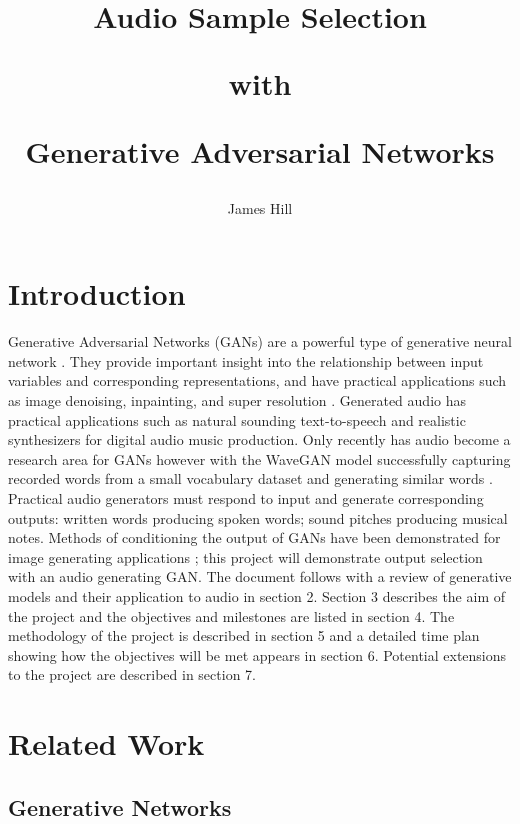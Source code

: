 \documentclass[a4paper, dvipsnames, titlepage]{article}
\title{
  \begin{center}Audio Sample Selection\end{center}
  \begin{center}with\end{center}
  \begin{center}Generative Adversarial Networks\end{center}
  }
\author{James Hill}
\date{}
\begin{document}
\maketitle
\tableofcontents

\newpage

\section{Introduction}

Generative Adversarial Networks (GANs) are a powerful type of generative neural network \citep{2014arXiv1406.2661G}.
They provide important insight into the relationship between input variables and corresponding representations, and have practical applications such as image denoising, inpainting, and super resolution \citep{openai_blog_2017}.
\newline
\newline
Generated audio has practical applications such as natural sounding text-to-speech and realistic synthesizers for digital audio music production.
Only recently has audio become a research area for GANs however with the WaveGAN model successfully capturing recorded words from a small vocabulary dataset and generating similar words \citep{2018arXiv180204208D}.
\newline
\newline
Practical audio generators must respond to input and generate corresponding outputs: written words producing spoken words; sound pitches producing musical notes.
Methods of conditioning the output of GANs have been demonstrated for image generating applications \citep{2014arXiv1411.1784M}; this project will demonstrate output selection with an audio generating GAN.
\newline
\newline
The document follows with a review of generative models and their application to audio in section 2.
Section 3 describes the aim of the project and the objectives and milestones are listed in section 4.
The methodology of the project is described in section 5 and a detailed time plan showing how the objectives will be met appears in section 6.
Potential extensions to the project are described in section 7.

\newpage

\section{Related Work}

\subsection{Generative Networks}
\end{document}
